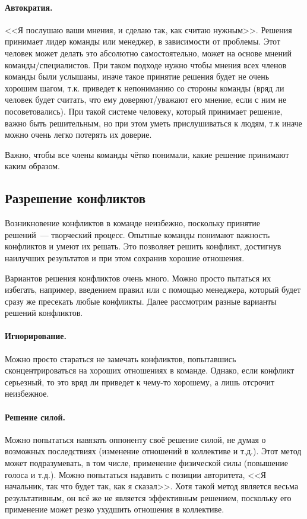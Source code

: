 \documentclass{../../text-style}
\begin{document}
\paragraph*{Автократия.} <<Я послушаю ваши мнения, и сделаю так, как считаю нужным>>. Решения принимает лидер команды или менеджер, в зависимости от проблемы. Этот человек может делать это абсолютно самостоятельно, может на основе мнений команды/специалистов. При таком подходе нужно чтобы мнения всех членов команды были услышаны, иначе такое принятие решения будет не очень хорошим шагом, т.к. приведет к непониманию со стороны команды (вряд ли человек будет считать, что ему доверяют/уважают его мнение, если с ним не посоветовались). При такой системе человеку, который принимает решение, важно быть решительным, но при этом уметь прислушиваться к людям, т.к иначе можно очень легко потерять их доверие.

Важно, чтобы все члены команды чётко понимали, какие решение принимают каким образом.

\subsection{Разрешение конфликтов}

Возникновение конфликтов в команде неизбежно, поскольку принятие решений~--- творческий процесс. Опытные команды понимают важность конфликтов и умеют их решать. Это позволяет решить конфликт, достигнув наилучших результатов и при этом сохранив хорошие отношения.

Вариантов решения конфликтов очень много. Можно просто пытаться их избегать, например, введением правил или с помощью менеджера, который будет сразу же пресекать любые конфликты. Далее рассмотрим разные варианты решений конфликтов.

\paragraph*{Игнорирование.} Можно просто стараться не замечать конфликтов, попытавшись сконцентрироваться на хороших отношениях в команде. Однако, если конфликт серьезный, то это вряд ли приведет к чему-то хорошему, а лишь отсрочит неизбежное.

\paragraph*{Решение силой.} Можно попытаться навязать оппоненту своё решение силой, не думая о возможных последствиях (изменение отношений в коллективе и т.д.). Этот метод может подразумевать, в том числе, применение физической силы (повышение голоса и т.д.). Можно попытаться надавить с позиции авторитета, <<Я начальник, так что будет так, как я сказал>>. Хотя такой метод является весьма результативным, он всё же не является эффективным решением, поскольку его применение может резко ухудшить отношения в коллективе.
\end{document}
